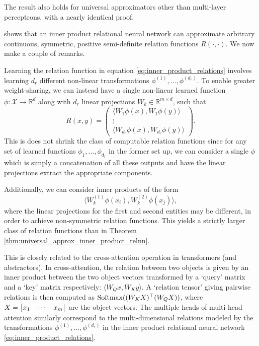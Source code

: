 \begin{remark}
	The result also holds for universal approximators other than multi-layer perceptrons, with a nearly identical proof.
\end{remark}

 shows that an inner product relational neural network can approximate arbitrary continuous, symmetric, positive semi-definite relation functions $R(\cdot, \cdot)$. We now make a couple of remarks.

Learning the relation function in equation \eqref{eq:inner_product_relations} involves learning $d_r$ different non-linear transformations $\phi^{(1)}, ..., \phi^{(d_r)}$. To enable greater weight-sharing, we can instead have a single non-linear learned function $\phi: \mathcal{X} \to \mathbb{R}^{\tilde{d}}$ along with $d_r$ linear projections $W_k \in \mathbb{R}^{m \times \tilde{d}}$, such that
\begin{equation}
	\label{eq:weight_sharing_inner_product_relnn}
	R(x,y) = \begin{pmatrix}\langle W_1 \phi(x), W_1 \phi(y) \rangle \\ \vdots \\ \langle W_{d_r}\phi(x), W_{d_r}\phi(y) \rangle\end{pmatrix}.
\end{equation}
This is does not shrink the class of computable relation functions since for any set of learned functions $\phi_1, ..., \phi_{d_r}$ in the former set up, we can consider a single $\phi$ which is simply a concatenation of all these outputs and have the linear projections extract the appropriate components.

Additionally, we can consider inner products of the form
\begin{equation}
	\label{eq:nonsymmetric_inner_product_relnn}
	\langle W_k^{(1)} \phi(x_i), W_k^{(2)} \phi(x_j) \rangle,
\end{equation}
\noindent where the linear projections for the first and second entities may be different, in order to achieve non-symmetric relation functions. This yields a strictly larger class of relation functions than in Theorem \ref{thm:universal_approx_inner_product_relnn}.

This is closely related to the cross-attention operation in transformers (and  abstractors). In cross-attention, the relation between two objects is given by an inner product between the two object vectors transformed by a `query' matrix and a `key' matrix respectively: $\langle W_Q x, W_K y \rangle$. A `relation tensor' giving pairwise relations is then computed as $\text{Softmax}((W_K X)^\top (W_Q X))$, where $X = \begin{bmatrix} x_1 & \cdots & x_\m\end{bmatrix}$ are the object vectors. The multiple heads of multi-head attention similarly correspond to the multi-dimensional relations modeled by the transformations $\phi^{(1)}, ..., \phi^{(d_r)}$ in the inner product relational neural network \ref{eq:inner_product_relations}.

